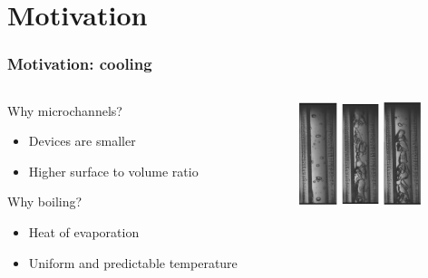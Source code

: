 \section[Motivation]{Motivation}
\begin{frame}
  \frametitle{Motivation: cooling}
  \begin{columns}
    \begin{column}{0.5\textwidth}
      \begin{block}{Why microchannels?}
        \begin{itemize}
        \item Devices are smaller
        \item Higher surface to volume ratio
        \end{itemize}
      \end{block}
      \begin{block}{Why boiling?}
        \begin{itemize}
        \item Heat of evaporation
        \item Uniform and predictable temperature
        \end{itemize}
      \end{block}
    \end{column}
    \begin{column}{0.5\textwidth}
      \begin{figure}
        \centering
        \includegraphics[width=1.1cm]{exp01.png}
        \includegraphics[width=1.1cm]{exp02.png}
        \includegraphics[width=1.1cm]{exp03.png}

\end{figure}
\end{column}
\end{columns}
\end{frame}
